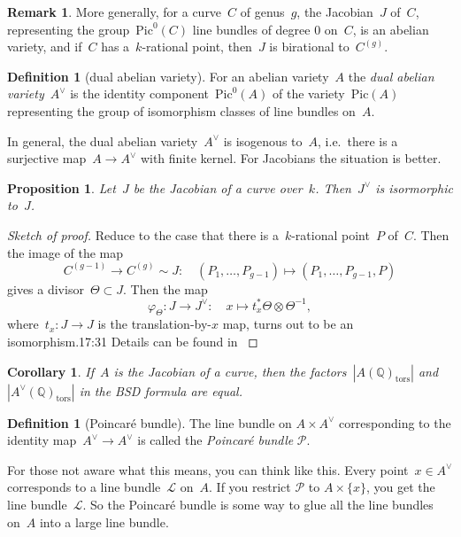 \documentclass[12pt]{article}
\newtheorem{proposition}[theorem]{Proposition}
\newtheorem{corollary}[theorem]{Corollary}
\theoremstyle{definition}
\newtheorem{definition}[theorem]{Definition}
\newtheorem{remark}[theorem]{Remark}
\numberwithin{equation}{subsection}
\newcommand{\Q}{\ensuremath{\mathbb{Q}}}
\begin{document}
\begin{remark}
More generally, for a curve~$C$ of genus~$g$, the Jacobian~$J$ of~$C$, representing the group~$\mathrm{Pic}^0(C)$ line bundles of degree 0 on~$C$, is an abelian variety, and if~$C$ has a~$k$-rational point, then~$J$ is birational to~$C^{(g)}$.
\end{remark}

\begin{definition}[dual abelian variety]
For an abelian variety~$A$ the {\em dual abelian variety}~$A^\vee$ is the identity component~$\mathrm{Pic}^0(A)$ of the variety~$\mathrm{Pic}(A)$ representing the group of isomorphism classes of line bundles on~$A$.
\end{definition}

In general, the dual abelian variety~$A^{\vee}$ is isogenous to~$A$, i.e.\ there is a surjective map~$A \to A^{\vee}$ with finite kernel. For Jacobians the situation is better.

\begin{proposition}
Let~$J$ be the Jacobian of a curve over~$k$. Then~$J^\vee$ is isormorphic to~$J$.
\end{proposition}

\begin{proof}[Sketch of proof]
Reduce to the case that there is a~$k$-rational point~$P$ of~$C$.
Then the image of the map~$$C^{(g-1)} \to C^{(g)} \sim J \colon \quad (P_1, \ldots, P_{g-1}) \mapsto (P_1, \ldots, P_{g-1}, P)$$ gives a divisor~$\Theta \subset J$.
Then the map~$$\varphi_{\Theta} \colon J \to J^\vee \colon \quad x \mapsto t_x^* \Theta \otimes \Theta^{-1},$$ where~$t_x \colon J \to J$ is the translation-by-$x$ map, turns out to be an isomorphism.17:31
Details can be found in \cite[Chapter 14]{AbVarBook}
\end{proof}

\begin{corollary}
If~$A$ is the Jacobian of a curve, then the factors~$|A(\Q)_{\mathrm{tors}}|$ and~$|A^{\vee}(\Q)_{\mathrm{tors}}|$ in the BSD formula are equal.
\end{corollary}

\begin{definition}[Poincar\'e bundle]
The line bundle on $A \times A^\vee$ corresponding to the identity map~$A^\vee \to A^\vee$ is called the {\em Poincar\'e bundle} $\mathcal{P}$.
\end{definition}

For those not aware what this means, you can think like this.
Every point~$x \in A^\vee$ corresponds to a line bundle~$\mathcal{L}$ on~$A$.
If you restrict $\mathcal{P}$ to $A \times \{x\}$, you get the line bundle~$\mathcal{L}$.
So the Poincar\'e bundle is some way to glue all the line bundles on~$A$ into a large line bundle.
\end{document}
